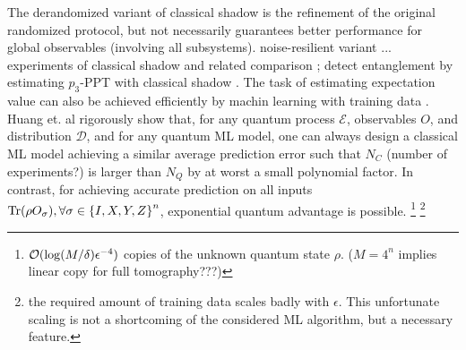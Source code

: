 \documentclass[
aps,
pra,
twocolumn,
floatfix,
]{revtex4-2}
\theoremstyle{plain}
\theoremstyle{definition}
\newcommand{\ob}{O}
\newcommand{\pob}{O}
\newcommand{\dm}{\rho}
\begin{document}
The derandomized variant of classical shadow \cite{huangEfficientEstimationPauli2021} is the refinement of the original randomized protocol, 
but not necessarily guarantees better performance for global observables (involving all subsystems).  
noise-resilient variant \cite{chenRobustShadowEstimation2021} ...
experiments of classical shadow and related comparison \cite{zhangExperimentalQuantumState2021};
detect entanglement by estimating $p_3$-PPT with classical shadow \cite{elbenMixedstateEntanglementLocal2020}.
The task of estimating expectation value can also be achieved efficiently by machin learning with training data \cite{gaoEfficientRepresentationQuantum2017} \cite{torlaiManybodyQuantumState2018} \cite{huangPowerDataQuantum2021} \cite{huangProvablyEfficientMachine2022} \cite{zhuFlexibleLearningQuantum2022}.
Huang et. al rigorously show that, for any quantum process $\mathcal{E}$, observables $\ob$, and distribution $\mathcal{D}$, and for any quantum ML model, one can always design a classical ML model achieving a similar average prediction error such that $N_C$ (number of experiments?) is larger than $N_Q$ by at worst a small polynomial factor.
In contrast, for achieving accurate prediction on all inputs $\Tr(\dm\pob_{\sigma} ), \forall \sigma \in \qty{ I, X, Y, Z }^n$, exponential quantum advantage is possible.
\cite{huangInformationtheoreticBoundsQuantum2021}
	\footnote{
		$\mathcal{O}(\log(M/\delta)\epsilon^{-4})$ copies of the unknown quantum state $\dm$.
		($M=4^n$ implies linear copy for full tomography???)
	}
	\footnote{
		the required amount of training data scales badly with $\epsilon$. This unfortunate scaling is not a shortcoming of the considered ML algorithm, but a necessary feature.
	}
\end{document}
